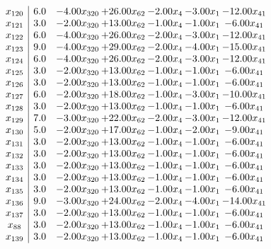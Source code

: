 \documentclass[8pt]{article}
\begin{document}
\[\begin{array}{c| c c@{\hskip 2pt} c@{\hskip 2pt} c@{\hskip 2pt} c@{\hskip 2pt} c@{\hskip 2pt} }
 x_{120}   &  6.0 & -4.00 x_{320} & + 26.00 x_{62} & -2.00 x_{4} & -3.00 x_{1} & -12.00 x_{41}\\
 x_{121}   &  3.0 & -2.00 x_{320} & + 13.00 x_{62} & -1.00 x_{4} & -1.00 x_{1} & -6.00 x_{41}\\
 x_{122}   &  6.0 & -4.00 x_{320} & + 26.00 x_{62} & -2.00 x_{4} & -3.00 x_{1} & -12.00 x_{41}\\
 x_{123}   &  9.0 & -4.00 x_{320} & + 29.00 x_{62} & -2.00 x_{4} & -4.00 x_{1} & -15.00 x_{41}\\
 x_{124}   &  6.0 & -4.00 x_{320} & + 26.00 x_{62} & -2.00 x_{4} & -3.00 x_{1} & -12.00 x_{41}\\
 x_{125}   &  3.0 & -2.00 x_{320} & + 13.00 x_{62} & -1.00 x_{4} & -1.00 x_{1} & -6.00 x_{41}\\
 x_{126}   &  3.0 & -2.00 x_{320} & + 13.00 x_{62} & -1.00 x_{4} & -1.00 x_{1} & -6.00 x_{41}\\
 x_{127}   &  6.0 & -2.00 x_{320} & + 18.00 x_{62} & -1.00 x_{4} & -3.00 x_{1} & -10.00 x_{41}\\
 x_{128}   &  3.0 & -2.00 x_{320} & + 13.00 x_{62} & -1.00 x_{4} & -1.00 x_{1} & -6.00 x_{41}\\
 x_{129}   &  7.0 & -3.00 x_{320} & + 22.00 x_{62} & -2.00 x_{4} & -3.00 x_{1} & -12.00 x_{41}\\
 x_{130}   &  5.0 & -2.00 x_{320} & + 17.00 x_{62} & -1.00 x_{4} & -2.00 x_{1} & -9.00 x_{41}\\
 x_{131}   &  3.0 & -2.00 x_{320} & + 13.00 x_{62} & -1.00 x_{4} & -1.00 x_{1} & -6.00 x_{41}\\
 x_{132}   &  3.0 & -2.00 x_{320} & + 13.00 x_{62} & -1.00 x_{4} & -1.00 x_{1} & -6.00 x_{41}\\
 x_{133}   &  3.0 & -2.00 x_{320} & + 13.00 x_{62} & -1.00 x_{4} & -1.00 x_{1} & -6.00 x_{41}\\
 x_{134}   &  3.0 & -2.00 x_{320} & + 13.00 x_{62} & -1.00 x_{4} & -1.00 x_{1} & -6.00 x_{41}\\
 x_{135}   &  3.0 & -2.00 x_{320} & + 13.00 x_{62} & -1.00 x_{4} & -1.00 x_{1} & -6.00 x_{41}\\
 x_{136}   &  9.0 & -3.00 x_{320} & + 24.00 x_{62} & -2.00 x_{4} & -4.00 x_{1} & -14.00 x_{41}\\
 x_{137}   &  3.0 & -2.00 x_{320} & + 13.00 x_{62} & -1.00 x_{4} & -1.00 x_{1} & -6.00 x_{41}\\
 x_{88}   &  3.0 & -2.00 x_{320} & + 13.00 x_{62} & -1.00 x_{4} & -1.00 x_{1} & -6.00 x_{41}\\
 x_{139}   &  3.0 & -2.00 x_{320} & + 13.00 x_{62} & -1.00 x_{4} & -1.00 x_{1} & -6.00 x_{41}\\

\end{array}\]
\end{document}
